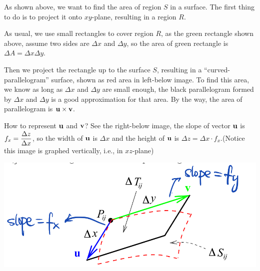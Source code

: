 \documentclass[11pt, a4paper]{MATH2023}
\begin{document}
\begin{spacing}{1.3}
    As shown above, we want to find the area of region $S$ in a surface. The first thing to do 
    is to project it onto $xy$-plane, resulting in a region $R$.

    As usual, we use small rectangles to cover region $R$, as the green rectangle shown above,
    assume two sides are $\Delta x$ and $\Delta y$, so the area of green rectangle is $\Delta A
    =\Delta x\Delta y$.

    Then we project the rectangle up to the surface $S$, resulting in a ``curved-parallelogram''
    surface, shown as red area in left-below image. To find this area, we know as long as 
    $\Delta x$ and $\Delta y$ are small enough, the black parallelogram formed by $\Delta x$ and $\Delta y$
    is a good approximation for that area. By the way, the area of parallelogram is ${\bf u}\times {\bf v}$.

    How to represent ${\bf u}$ and ${\bf v}$? See the right-below image, the slope of vector ${\bf u}$
    is $\disp f_x=\dfrac{\Delta z}{\Delta x}$, so the width of ${\bf u}$ is $\Delta x$ and the height 
    of ${\bf u}$ is $\Delta z = \Delta x\cdot f_x$.(Notice this image is graphed vertically, i.e., 
    in $xz$-plane)


    \begin{center}
        \includegraphics[scale=0.27]{images/Ch14-surface-area-vector.jpeg}
        \hspace{0.5in}
        \begin{tikzpicture}[x=0.75pt,y=0.75pt,yscale=-1,xscale=1]


\end{tikzpicture}
\end{center}
\end{spacing}
\end{document}
